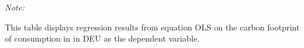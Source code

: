 \begin{table}[htbp!]
\begin{adjustbox}{width = 1\textwidth, max height = 0.95\textheight, center}
\begin{threeparttable}[b]
         \begin{tablenotes}\item \medskip \textit{Note:}
            \item This table displays regression results from equation OLS on the carbon footprint of consumption in  in DEU as the dependent variable.  
         \end{tablenotes}
      \end{threeparttable}
   \end{adjustbox}
\end{table}


